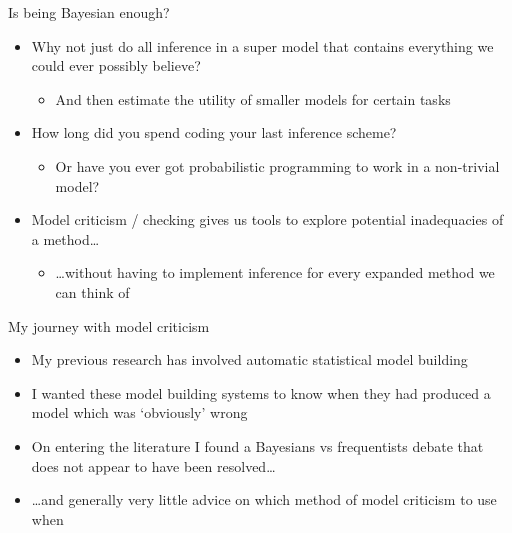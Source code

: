 \begin{frame}{Is being Bayesian enough?}
  \begin{itemize}
    \item Why not just do all inference in a super model that contains everything we could ever possibly believe?
    \pause
    \begin{itemize}
      \item And then \eg estimate the utility of smaller models for certain tasks
    \end{itemize}
    \vspace{\baselineskip}
    \pause
    \item How long did you spend coding your last inference scheme?
    \begin{itemize}
      \item Or have you ever got probabilistic programming to work in a non-trivial model?
    \end{itemize}
    \vspace{\baselineskip}
    \pause
    \item Model criticism / checking gives us tools to explore potential inadequacies of a method\dots
    \begin{itemize}
       \item \dots without having to implement inference for every expanded method we can think of
     \end{itemize}
  \end{itemize}
\end{frame}

\begin{frame}{My journey with model criticism}
  \begin{itemize}
    \item My previous research has involved automatic statistical model building
    \vspace{\baselineskip}
    \pause
    \item I wanted these model building systems to know when they had produced a model which was `obviously' wrong
    \vspace{\baselineskip}
    \pause
    \item On entering the literature I found a Bayesians vs frequentists debate that does not appear to have been resolved\dots
    \vspace{\baselineskip}
    \pause
    \item \dots and generally very little advice on which method of model criticism to use when
  \end{itemize}
\end{frame}

